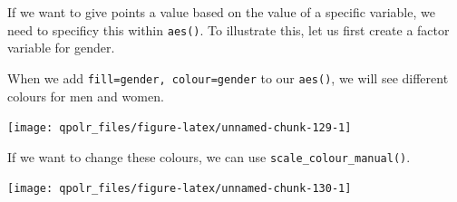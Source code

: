 \documentclass[12pt,oneside]{reedthesis}
\theoremstyle{definition}
\theoremstyle{definition}
\theoremstyle{definition}
\theoremstyle{remark}
\begin{document}
  If we want to give points a value based on the value of a specific
  variable, we need to specificy this within \texttt{aes()}. To illustrate
  this, let us first create a factor variable for gender.
  \begin{Shaded}
  \begin{Highlighting}[]
  \OperatorTok{$}\StringTok{ }\OperatorTok{$}\OperatorTok{==}\StringTok{ }\NormalTok{, }\NormalTok{, }\NormalTok{)}
  \end{Highlighting}
  \end{Shaded}
  When we add \texttt{fill=gender,\ colour=gender} to our \texttt{aes()},
  we will see different colours for men and women.
  \begin{Shaded}
  \begin{Highlighting}[]
  \NormalTok{(}\OperatorTok{+}
  \StringTok{  }\NormalTok{(} \NormalTok{) }\OperatorTok{+}\StringTok{ }
  \StringTok{  }\NormalTok{(}\NormalTok{, }\NormalTok{) }\OperatorTok{+}
  \StringTok{  }\NormalTok{()}
  \end{Highlighting}
  \end{Shaded}
  \begin{center}\texttt{[image: qpolr\_files/figure-latex/unnamed-chunk-129-1]} \end{center}
  
  If we want to change these colours, we can use
  \texttt{scale\_colour\_manual()}.
  \begin{Shaded}
  \begin{Highlighting}[]
  \NormalTok{(}\OperatorTok{+}
  \StringTok{  }\NormalTok{(} \NormalTok{) }\OperatorTok{+}\StringTok{ }
  \StringTok{  }\NormalTok{(}\NormalTok{, }\NormalTok{) }\OperatorTok{+}
  \StringTok{  }\NormalTok{(} \NormalTok{(}\NormalTok{, }\NormalTok{)) }\OperatorTok{+}
  \StringTok{  }\NormalTok{()}
  \end{Highlighting}
  \end{Shaded}
  \begin{center}\texttt{[image: qpolr\_files/figure-latex/unnamed-chunk-130-1]} \end{center}
  
\end{document}
